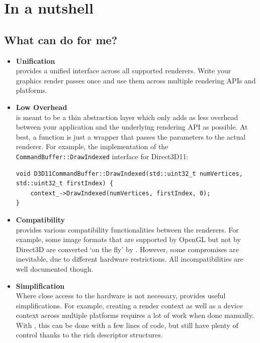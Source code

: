 \documentclass{article}
\begin{document}
\section{In a nutshell}

\subsection{What can \LLGL do for me?}

\begin{itemize}
	\item \textbf{Unification} \\
	\LLGL provides a unified interface across all supported renderers.
	Write your graphics render passes once and use them across multiple rendering APIs and platforms.
	
	\item \textbf{Low Overhead} \\
	\LLGL is meant to be a thin abstraction layer which only adds as less overhead between your application and the underlying rendering API as possible.
	At best, a function is just a wrapper that passes the parameters to the actual renderer.
	For example, the implementation of the \texttt{CommandBuffer::DrawIndexed} interface for Direct3D11:
\begin{lstlisting}
void D3D11CommandBuffer::DrawIndexed(std::uint32_t numVertices, std::uint32_t firstIndex) {
    context_->DrawIndexed(numVertices, firstIndex, 0);
}
\end{lstlisting}
	
	\item \textbf{Compatibility} \\
	\LLGL provides various compatibility functionalities between the renderers.
	For example, some image formats that are supported by OpenGL but not by Direct3D are converted `on the fly' by \LLGL.
	However, some compromises are inevitable, due to different hardware restrictions.
	All incompatibilities are well documented though.
	
	\item \textbf{Simplification} \\
	Where close access to the hardware is not necessary, \LLGL provides useful simplifications.
	For example, creating a render context as well as a device context across multiple platforms requires a lot of work when done manually.
	With \LLGL, this can be done with a few lines of code, but still have plenty of control thanks to the rich descriptor structures.
	

\end{itemize}
\end{document}
